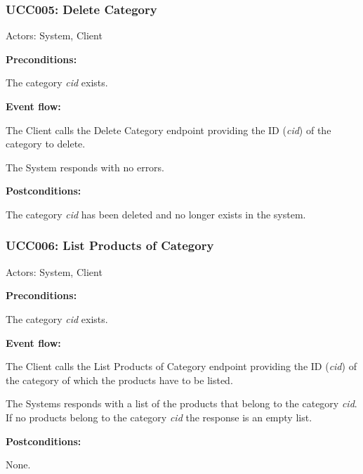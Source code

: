 \begin{ucbox}{\subsubsection{UCC005: Delete Category}}
\label{UCC005}

Actors: System, Client

\textbf{Preconditions:}

\ucitem The category \textit{cid} exists.

\textbf{Event flow:}

\ucitem The Client calls the Delete Category endpoint providing the ID (\textit{cid}) of the category to delete.

\ucitem The System responds with no errors.

\textbf{Postconditions:}

\ucitem The category \textit{cid} has been deleted and no longer exists in the system.

\end{ucbox}

\begin{ucbox}{\subsubsection{UCC006: List Products of Category}}
\label{UCC006}

Actors: System, Client

\textbf{Preconditions:}

\ucitem The category \textit{cid} exists.

\textbf{Event flow:}

\ucitem The Client calls the List Products of Category endpoint providing the ID (\textit{cid}) of the category of which the products have to be listed.

\ucitem The Systems responds with a list of the products that belong to the category \textit{cid}. If no products belong to the category \textit{cid} the response is an empty list.

\textbf{Postconditions:}

\ucitem None.

\end{ucbox}

